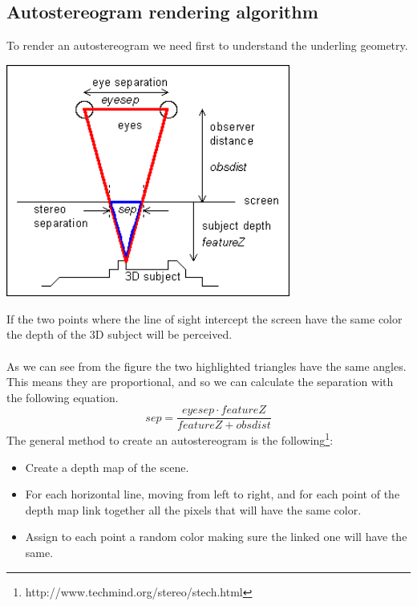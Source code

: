 \documentclass[12pt, a4paper]{article}
\begin{document}
\subsection{Autostereogram rendering algorithm}
To render an autostereogram we need first to understand the underling geometry.\\
\begin{center}
    \centering
    \includegraphics[width=0.7\textwidth]{img/geometry.png}
\end{center}
If the two points where the line of sight intercept the screen have the same color the depth of the 3D
subject will be perceived.\\\\
As we can see from the figure the two highlighted triangles have the same angles.
This means they are proportional, and so we can calculate the separation with the following equation.
\[
sep = \frac{eyesep \cdot featureZ}{featureZ + obsdist}
\]
The general method to create an autostereogram is the following\footnote{http://www.techmind.org/stereo/stech.html}:
\begin{itemize}
    \item Create a depth map of the scene.
    \item For each horizontal line, moving from left to right, and for each point of the depth map link together all the pixels that will have the same color.
    \item Assign to each point a random color making sure the linked one will have the same.
\end{itemize}
\end{document}
